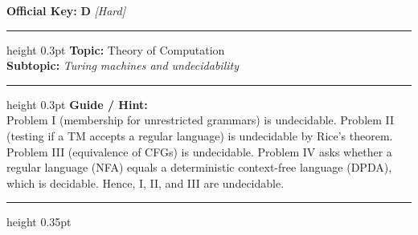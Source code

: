 \documentclass[a4paper,10pt]{article}
\begin{document}
\begin{tcolorbox}
\textbf{Official Key:} \textbf{\large D} \hfill \textit{\small [Hard]}
\vspace{2pt}\hrule height 0.3pt\vspace{3pt}
\textbf{Topic:} Theory of Computation \\
\textbf{Subtopic:} \textit{Turing machines and undecidability}
\vspace{2pt}\hrule height 0.3pt\vspace{3pt}
\textbf{Guide / Hint:} \\
{\small Problem I (membership for unrestricted grammars) is undecidable. Problem II (testing if a TM accepts a regular language) is undecidable by Rice's theorem. Problem III (equivalence of CFGs) is undecidable. Problem IV asks whether a regular language (NFA) equals a deterministic context-free language (DPDA), which is decidable. Hence, I, II, and III are undecidable.}

\end{tcolorbox}
\vspace{6pt}\hrule height 0.35pt\vspace{6pt}
\noindent
\end{document}
